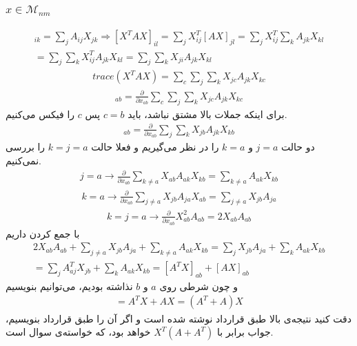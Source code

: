 \documentclass[12pt,onecolumn,a4paper]{article}
\begin{document}
	\subsubsection*{$x \in \mathcal{M}_{nm}$}
	\begin{align*}
		[AX]_{ik} = \sum_{j} A_{ij}X_{jk} \Rightarrow [X^T A X]_{il} = \sum_{j} X^T_{ij} [AX]_{jl} = \sum_{j} X^T_{ij} \sum_{k} A_{jk} X_{kl} \\ = \sum_{j}\sum_{k} X^T_{ij}A_{jk}X_{kl} = \sum_{j}\sum_{k} X_{ji}A_{jk}X_{kl}
	\end{align*}
	\begin{align*}
		trace(X^T A X) = \sum_{c} \sum_{j} \sum_{k} X_{jc} A_{jk} X_{kc}
	\end{align*}
	\begin{align*}
		[\frac{\partial trace(X^T A X)}{X}]_{ab} = \frac{\partial}{\partial x_{ab}} \sum_{c} \sum_{j} \sum_{k} X_{jc} A_{jk} X_{kc}
	\end{align*}
برای اینکه جملات بالا مشتق نباشد، باید 
$c = b$
پس 
$c$
را فیکس می‌کنیم.
\begin{align*}
	[\frac{\partial trace(X^T A X)}{X}]_{ab} = \frac{\partial}{\partial x_{ab}} \sum_{j} \sum_{k} X_{jb} A_{jk} X_{kb}
\end{align*}
دو حالت
$j = a$
و
$k = a$
را در نظر می‌گیریم و فعلا حالت
$k = j = a$
را بررسی نمی‌کنیم.
\\
\begin{align*}
	j = a \rightarrow \frac{\partial}{\partial x_{ab}} \sum_{k \neq a} X_{ab} A_{ak} X_{kb} = \sum_{k \neq a} A_{ak} X_{kb}
\end{align*}
\begin{align*}
	k = a \rightarrow \frac{\partial}{\partial x_{ab}} \sum_{j \neq a} X_{jb} A_{ja} X_{ab} = \sum_{j \neq a} X_{jb} A_{ja}
\end{align*}
\begin{align*}
	k = j = a \rightarrow \frac{\partial}{\partial x_{ab}} X_{ab}^2 A_{ab} = 2X_{ab} A_{ab}
\end{align*}
با جمع کردن داریم
\begin{align*}
	2X_{ab} A_{ab} + \sum_{j \neq a} X_{jb} A_{ja} + \sum_{k \neq a} A_{ak} X_{kb} = \sum_{j} X_{jb} A_{ja} + \sum_{k} A_{ak} X_{kb} \\ = \sum_{j} A^T_{aj} X_{jb} + \sum_{k} A_{ak} X_{kb} = [A^TX]_{ab} + [AX]_{ab} 
\end{align*}
و چون شرطی روی 
$a$
و
$b$
نذاشته بودیم، می‌توانیم بنویسیم 
\begin{align*}
	[\frac{\partial trace(X^T A X)}{X}] = A^T X + AX =  (A^T + A)X
\end{align*}
دقت کنید نتیجه‌ی بالا طبق قرارداد 
نوشته شده است و اگر آن را طبق قرارداد
بنویسیم، جواب برابر با
$X^T(A + A^T)$
خواهد بود، که خواسته‌ی سوال است.
\end{document}
